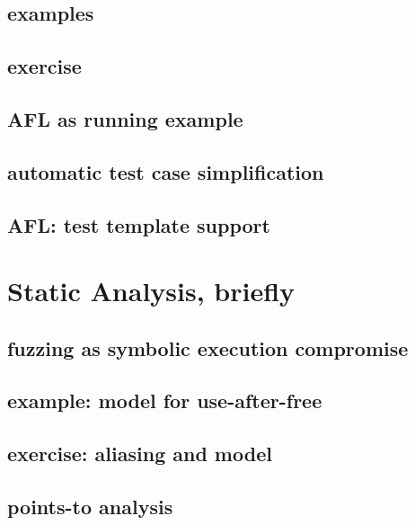 \subsection{examples}


\subsection{exercise}


\subsection{AFL as running example}


\subsection{automatic test case simplification}


\subsection{AFL: test template support}


\section{Static Analysis, briefly}

\subsection{fuzzing as symbolic execution compromise}


\subsection{example: model for use-after-free}


\subsection{exercise: aliasing and model}


\subsection{points-to analysis}

